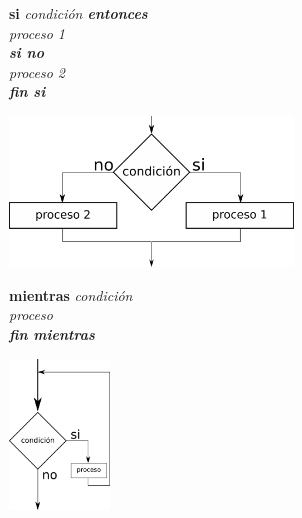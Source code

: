 \vspace{10mm}

\begin{minipage}{0.5\textwidth}
  \textbf{si} \it{condición} \textbf{entonces}\\
  \hspace*{10mm}\it{proceso 1}\\
  \textbf{si no}\\
  \hspace*{10mm}\it{proceso 2}\\
  \textbf{fin si}\\
\end{minipage}
\begin{minipage}{0.5\textwidth}
  \includegraphics[height=40mm]{img/if_else.pdf}
\end{minipage}

\vspace{10mm}

\begin{minipage}{0.5\textwidth}
  \textbf{mientras} \it{condición} \\
  \hspace*{10mm}\it{proceso}\\
  \textbf{fin mientras}\\
\end{minipage}
\begin{minipage}{0.5\textwidth}
\center
  \includegraphics[height=40mm]{img/mientras.pdf}
\end{minipage}

\vspace{10mm}

